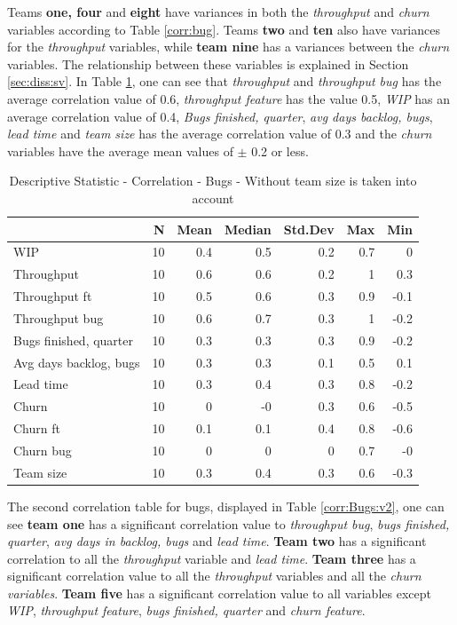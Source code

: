 \documentclass[UKenglish]{ifimaster}  %
\begin{document}
Teams \textbf{one, four} and \textbf{eight} have variances in both the \textit{throughput} and \textit{churn} variables according to Table \ref{corr:bug}. Teams \textbf{two} and \textbf{ten} also have variances for the \textit{throughput} variables, while \textbf{team nine} has a variances between the \textit{churn} variables. The relationship between these variables is explained in  Section \ref{sec:diss:sv}.
In Table \ref{DS:corr:Bugs}, one can see that \textit{throughput} and \textit{throughput bug} has the average correlation value of 0.6, \textit{throughput feature} has the value 0.5, \textit{WIP} has an average correlation value of 0.4,  \textit{Bugs finished, quarter}, \textit{avg days backlog, bugs}, \textit{lead time} and \textit{team size} has the average correlation value of 0.3 and the \textit{churn} variables have the average  mean values of $\pm$ 0.2 or less.

\begin{table} [h]
 \centering
 \begin{tabular}{ | l | r | r | r | r | r | r | }
 \hline
& \bf{N} & \bf{Mean} & \bf{Median} & \bf{Std.Dev} & \bf{Max} & \bf{Min} \\ \hline
WIP  & 10 & 0.4 & 0.5 & 0.2 & 0.7 & 0\\ \hline
Throughput  & 10 & 0.6 & 0.6 & 0.2 & 1 & 0.3\\ \hline
Throughput ft  & 10 & 0.5 & 0.6 & 0.3 & 0.9 & -0.1\\ \hline
Throughput bug  & 10 & 0.6 & 0.7 & 0.3 & 1 & -0.2\\ \hline
Bugs finished, quarter  & 10 & 0.3 & 0.3 & 0.3 & 0.9 & -0.2\\ \hline
Avg days backlog, bugs  & 10 & 0.3 & 0.3 & 0.1 & 0.5 & 0.1\\ \hline
Lead time & 10 & 0.3 & 0.4 & 0.3 & 0.8 & -0.2\\ \hline
Churn  & 10 & 0 & -0 & 0.3 & 0.6 & -0.5\\ \hline
Churn ft  & 10 & 0.1 & 0.1 & 0.4 & 0.8 & -0.6\\ \hline
Churn bug  & 10 & 0 & 0 & 0 & 0.7 & -0\\ \hline
Team size  & 10 & 0.3 & 0.4 & 0.3 & 0.6 & -0.3\\ \hline
\end{tabular}
 \caption{Descriptive Statistic - Correlation - Bugs - Without team size is taken into account}
 \label{DS:corr:Bugs}
 \end{table}
 \newpage
The second correlation table for bugs, displayed in Table \ref{corr:Bugs:v2}, one can see \textbf{team one} has a significant correlation value to \textit{throughput bug}, \textit{bugs finished, quarter}, \textit{avg days in backlog, bugs} and \textit{lead time}. \textbf{Team two} has a significant correlation to all the \textit{throughput} variable and \textit{lead time}. \textbf{Team three} has a significant correlation value to all the \textit{throughput} variables and all the \textit{churn variables}. \textbf{Team five} has a significant correlation value to all variables except \textit{WIP}, \textit{throughput feature}, \textit{bugs finished, quarter} and \textit{churn feature}.
\end{document}
